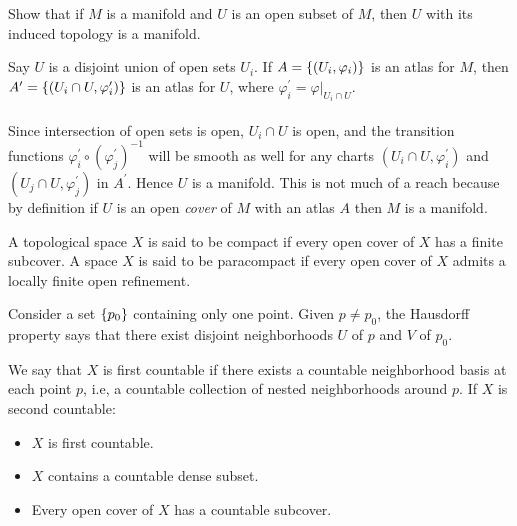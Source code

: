 \documentclass[10pt]{article}
\begin{document}
\begin{example}\label{b1e4}
	Show that if $M$ is a manifold and $U$ is an open subset of $M$, then $U$ with
	its induced topology is a manifold.
\end{example}
\sol Say $U$ is a disjoint union of open sets $U_i$.
If $A=\lbrace(U_i,\varphi_i)\rbrace$ is an atlas for $M$,
then $A^\prime=\lbrace(U_i \cap U,\varphi_i^\prime)\rbrace$ is an atlas for $U$, where
$\varphi_i^\prime = \varphi|_{U_i \cap U}$.\\\\
Since intersection of open sets is open, $U_i \cap U$ is open, and the transition functions
$\varphi_i^\prime \circ (\varphi_j^\prime)^{-1}$ will be smooth as well for any charts
$(U_i \cap U,\varphi_i^\prime)$ and $(U_j \cap U,\varphi_j^\prime)$ in $A^\prime$.
Hence $U$ is a manifold. This is not much of a reach because by definition if $U$ is an open \emph{cover}
of $M$ with an atlas $A$ then $M$ is a manifold.


\begin{definition}
	A topological space $X$ is said to be compact if every open cover of $X$ has a finite subcover. A space $X$ is said to be paracompact if every open cover of $X$ admits a locally finite open refinement.
\end{definition}


\begin{definition}
	 Consider a set $\lbrace p_0\rbrace$ containing only one point.
	Given $p \ne p_0$, the Hausdorff property says that there exist disjoint 
	neighborhoods $U$ of $p$ and $V$ of $p_0$.
\end{definition}


\begin{definition}
	 We say that $X$ is first countable
	if there exists a countable neighborhood basis at each point $p$, i.e, a countable collection
	of nested neighborhoods around $p$. If $X$ is second countable:
	\begin{itemize}
		\item $X$ is first countable.
		\item $X$ contains a countable dense subset.
		\item Every open cover of $X$ has a countable subcover.
	\end{itemize}
\end{definition}
\end{document}
